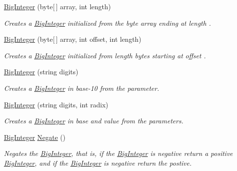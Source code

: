 \begin{DoxyCompactItemize}
\hyperlink{class_scott_garland_1_1_big_integer_a018f88f4c41760ccc0c7c76e1e6794a9}{Big\+Integer} (byte\mbox{[}$\,$\mbox{]} array, int length)
\begin{DoxyCompactList}\small\item\em Creates a \hyperlink{class_scott_garland_1_1_big_integer}{Big\+Integer} initialized from the byte array ending at {\itshape length} . \end{DoxyCompactList}\item 
\hyperlink{class_scott_garland_1_1_big_integer_aaee24d2962eea848eaa86c7607676b8b}{Big\+Integer} (byte\mbox{[}$\,$\mbox{]} array, int offset, int length)
\begin{DoxyCompactList}\small\item\em Creates a \hyperlink{class_scott_garland_1_1_big_integer}{Big\+Integer} initialized from {\itshape length}  bytes starting at {\itshape offset} . \end{DoxyCompactList}\item 
\hyperlink{class_scott_garland_1_1_big_integer_ad4bed1a734cd43fdfa188d4c94fe9577}{Big\+Integer} (string digits)
\begin{DoxyCompactList}\small\item\em Creates a \hyperlink{class_scott_garland_1_1_big_integer}{Big\+Integer} in base-\/10 from the parameter. \end{DoxyCompactList}\item 
\hyperlink{class_scott_garland_1_1_big_integer_aa998ee8f5c1fc81395b3acdd695c82f5}{Big\+Integer} (string digits, int radix)
\begin{DoxyCompactList}\small\item\em Creates a \hyperlink{class_scott_garland_1_1_big_integer}{Big\+Integer} in base and value from the parameters. \end{DoxyCompactList}\item 
\hyperlink{class_scott_garland_1_1_big_integer}{Big\+Integer} \hyperlink{class_scott_garland_1_1_big_integer_a91144e3aedfda684b3d5e5cdb4b86cbb}{Negate} ()
\begin{DoxyCompactList}\small\item\em Negates the \hyperlink{class_scott_garland_1_1_big_integer}{Big\+Integer}, that is, if the \hyperlink{class_scott_garland_1_1_big_integer}{Big\+Integer} is negative return a positive \hyperlink{class_scott_garland_1_1_big_integer}{Big\+Integer}, and if the \hyperlink{class_scott_garland_1_1_big_integer}{Big\+Integer} is negative return the postive. \end{DoxyCompactList}\item 

\end{DoxyCompactItemize}

